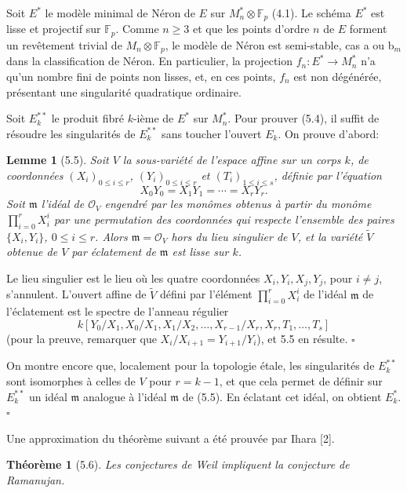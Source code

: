 \documentclass[10pt]{article}
\newcommand{\cO}{\mathcal O}
\newcommand{\QED}{\hfill$\square$}
\newcommand{\F}{\mathbb F}
\newtheorem*{theorem}{Théorème}
\newtheorem*{lemma}{Lemme}
\begin{document}
Soit $E^*$ le modèle minimal de Néron de $E$ sur $M_n^*\otimes\F_p$ (4.1). Le schéma $E^*$ est lisse et projectif sur $\F_p$. Comme $n\ge3$ et que les points d'ordre $n$ de $E$ forment un revêtement trivial de $M_n\otimes\F_p$, le modèle de Néron est semi-stable, cas a ou b$_m$ dans la classification de Néron. En particulier, la projection $f_n:E^*\to M_n^*$ n'a qu'un nombre fini de points non lisses, et, en ces points, $f_n$ est non dégénérée, présentant une singularité quadratique ordinaire.

Soit $E_k^{**}$ le produit fibré $k$-ième de $E^*$ sur $M_n^*$. Pour prouver (5.4), il suffit de résoudre les singularités de $E_k^{**}$ sans toucher l'ouvert $E_k$. On prouve d'abord:

\begin{lemma}[5.5]
Soit $V$ la sous-variété de l'espace affine sur un corps $k$, de coordonnées $(X_i)_{0\le i\le r}$, $(Y_i)_{0\le i\le r}$ et $(T_i)_{1\le i\le s}$, définie par l'équation
\[
X_0Y_0=X_1Y_1=\cdots=X_rY_r.
\]
Soit $\mathfrak m$ l'idéal de $\cO_V$ engendré par les monômes obtenus à partir du monôme $\prod_{i=0}^rX_i^i$ par une permutation des coordonnées qui respecte l'ensemble des paires $\{X_i,Y_i\}$, $0\le i\le r$. Alors $\mathfrak m=\cO_V$ hors du lieu singulier de $V$, et la variété $\widetilde V$ obtenue de $V$ par éclatement de $\mathfrak m$ est lisse sur $k$.
\end{lemma}

Le lieu singulier est le lieu où les quatre coordonnées $X_i,Y_i,X_j,Y_j$, pour $i\ne j$, s'annulent. L'ouvert affine de $\widetilde V$ défini par l'élément $\prod_{i=0}^rX_i^i$ de l'idéal $\mathfrak m$ de l'éclatement est le spectre de l'anneau régulier
\[
k[Y_0/X_1,X_0/X_1,X_1/X_2,\ldots,X_{r-1}/X_r,X_r,T_1,\ldots,T_s]
\]
(pour la preuve, remarquer que $X_i/X_{i+1}=Y_{i+1}/Y_i$), et 5.5 en résulte. \QED

On montre encore que, localement pour la topologie étale, les singularités de $E_k^{**}$ sont isomorphes à celles de $V$ pour $r=k-1$, et que cela permet de définir sur $E_k^{**}$ un idéal $\mathfrak m$ analogue à l'idéal $\mathfrak m$ de (5.5). En éclatant cet idéal, on obtient $E_k^*$. \QED

Une approximation du théorème suivant a été prouvée par Ihara [2].

\begin{theorem}[5.6]
Les conjectures de Weil impliquent la conjecture de Ramanujan.
\end{theorem}
\end{document}
